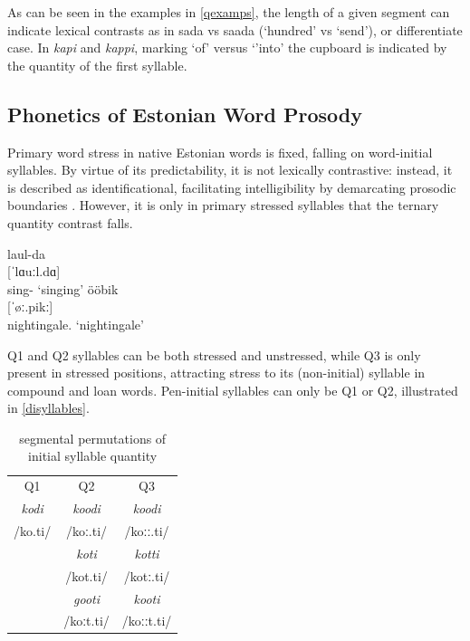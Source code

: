 As can be seen in the examples in \ref{qexamps}, the length of a given segment can indicate lexical contrasts as in sada vs saada (`hundred' vs `send'), or differentiate case. In {\it kapi} and {\it kappi}, marking `of' versus `'into' the cupboard is indicated by the quantity of the first syllable. 




\subsection{Phonetics of Estonian Word Prosody}


Primary word stress in native Estonian words is fixed, falling on word-initial syllables. By virtue of its predictability, it is not lexically contrastive: instead, it is described as identificational, facilitating intelligibility by demarcating prosodic boundaries \citep{lehiste1965, lehiste1978,lehiste1992, eekMeister1998, lippusAsuMari2014}. However, it is only in primary stressed syllables that the ternary quantity contrast falls. \begin{center}
\begin{exe}
\ex \gll laul-da \\
	{[ˈlɑuːl.dɑ]} \\
	sing-\Tr{} 
	\glt	`singing'
\ex 	\gll ööbik \\
	{[ˈøː.pikː]} \\
	nightingale.\Nom{} 
	\glt`nightingale'
\label{disyllables}
\end{exe}
\end{center}
Q1 and Q2 syllables can be both stressed and unstressed, while Q3 is only present in stressed positions, attracting stress to its (non-initial) syllable in compound and loan words. Pen-initial syllables can only be Q1 or Q2, illustrated in \ref{disyllables}. 

 \begin{table}[htb]
\centering
\begin{tabular}{ccc}
\hline
Q1 & Q2 & Q3 \\
{\it kodi	} 	& {\it koodi }	& {\it koodi }	\\  
/ko.ti/		& /koː.ti/	& /koːː.ti/	\\
\hline
		& {\it koti }	& {\it kotti}	 \\
		& /kot.ti/	& /kotː.ti/	\\
\hline
		& {\it gooti}	& {\it kooti} 	\\
		& /koːt.ti/	& /koːːt.ti/	\\
\hline
\end{tabular}

\caption{segmental permutations of initial syllable quantity}
\label{qperm}
\end{table}

